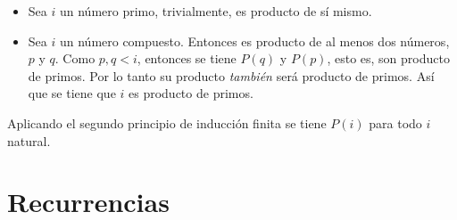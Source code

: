 \documentclass[a4paper]{article}
\theoremstyle{plain} \newtheorem{PrimerPrincipio}{Teorema}
\theoremstyle{plain} \newtheorem{SegundoPrincipio}{Teorema}
\begin{document}
\begin{itemize}
				\item Sea $i$ un número primo, trivialmente, es producto de sí mismo.
				\item Sea $i$ un número compuesto. Entonces es producto de al menos dos números, $p$ y $q$. Como $p,q < i$, entonces se tiene $P(q)$ y $P(p)$, esto es, son producto de primos. Por lo tanto su producto \emph{también} será producto de primos. Así que se tiene que $i$ es producto de primos.
\end{itemize}

Aplicando el segundo principio de inducción finita se tiene $P(i)$ para todo $i$ natural.

\section{Recurrencias}
\end{document}
